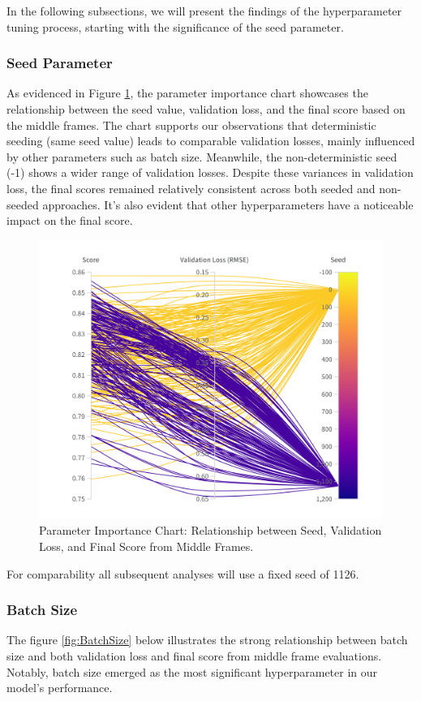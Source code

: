 \documentclass[a4paper,12pt,openright]{book}
\begin{document}
In the following subsections, we will present the findings of the hyperparameter tuning process, starting with the significance of the seed parameter.
\subsubsection{Seed Parameter}
As evidenced in Figure \ref{fig:SEED}, the parameter importance chart showcases the relationship between the seed value, validation loss, and the final score based on the middle frames. The chart supports our observations that deterministic seeding (same seed value) leads to comparable validation losses, mainly influenced by other parameters such as batch size. Meanwhile, the non-deterministic seed (-1) shows a wider range of validation losses. Despite these variances in validation loss, the final scores remained relatively consistent across both seeded and non-seeded approaches. It's also evident that other hyperparameters have a noticeable impact on the final score. 

\begin{figure}[H]
\centering
\includegraphics[trim={0cm 2cm 0cm 2cm},clip,width=1.0\textwidth]{images/W&B Chart 03_09_2023, 15_11_19.png}
\caption{Parameter Importance Chart: Relationship between Seed, Validation Loss, and Final Score from Middle Frames.}
\label{fig:SEED}
\end{figure}
For comparability all subsequent analyses will use a fixed seed of 1126.




\subsubsection{Batch Size}
The figure \ref{fig:BatchSize} below illustrates the strong relationship between batch size and both validation loss and final score from middle frame evaluations. Notably, batch size emerged as the most significant hyperparameter in our model's performance.
\end{document}
